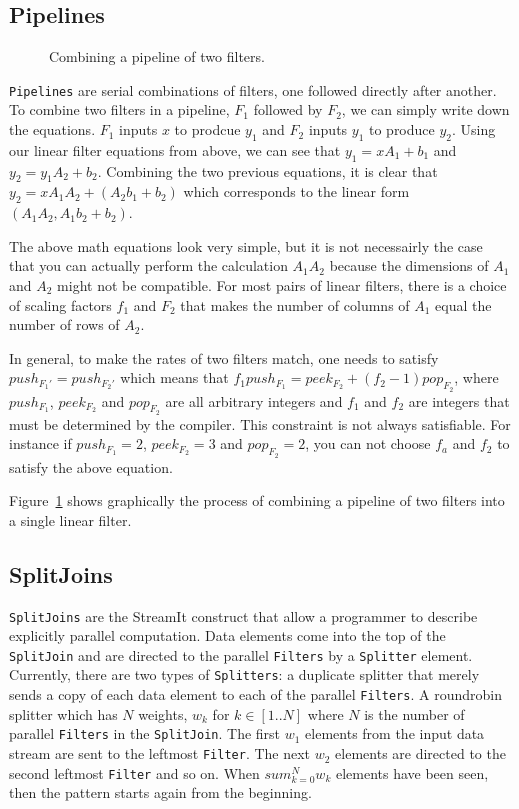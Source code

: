 \subsection{Pipelines}

\begin{figure}
\center
\epsfxsize=3.0in
\caption{Combining a pipeline of two filters.}
\label{fig:combining-pipeline}
\end{figure}

{\tt Pipelines} are serial combinations of filters, one followed directly after 
another. To combine two filters in a pipeline, $F_{1}$ followed by $F_{2}$, we can
simply write down the equations. $F_{1}$ inputs $x$ to prodcue $y_1$ and $F_{2}$
inputs $y_1$ to produce $y_2$. Using our linear filter equations from above,
we can see that $y_1 = xA_1 + b_1$ and $y_2 = y_1A_2 + b_2$. Combining the
two previous equations, it is clear that $y_2 = xA_1A_2 + (A_2b_1 + b_2)$ 
which corresponds to the linear form $(A_1A_2, A_1b_2+b_2)$. 

The above math equations look very simple, but it is not necessairly the case
that you can actually perform the calculation $A_1A_2$ because the dimensions of 
$A_1$ and $A_2$ might not be compatible. For most pairs of linear filters, there
is a choice of scaling factors $f_1$ and $F_2$ that makes the number of columns 
of $A_1$ equal the number of rows of $A_2$.

In general, to make the rates of two filters match, one needs to satisfy
$push_{F_{1}'} = push_{F_{2}'}$ which means that 
$f_1push_{F_1}=peek_{F_2}+(f_2-1)pop_{F_2}$, where $push_{F_1}$,
$peek_{F_2}$ and $pop_{F_2}$ are all arbitrary integers and 
$f_1$ and $f_2$ are integers that must be determined by the compiler.
This constraint is not always satisfiable. For instance if
$push_{F_1}=2$, $peek_{F_2}=3$ and $pop_{F_2}=2$, you can not
choose $f_a$ and $f_2$ to satisfy the above equation.

Figure~\ref{fig:combining-pipeline} shows graphically the process of combining
a pipeline of two filters into a single linear filter.

\subsection{SplitJoins}
{\tt SplitJoins} are the StreamIt construct that allow a programmer to describe explicitly 
parallel computation. Data elements come into the top of the {\tt SplitJoin} and are directed
to the parallel {\tt Filters} by a {\tt Splitter} element. Currently, there are two types of
{\tt Splitters}: a duplicate splitter that merely sends a copy of each data element to each
of the parallel {\tt Filters}. A roundrobin splitter which has $N$ weights, $w_k$ for $k\in[1..N]$
where $N$ is the number of parallel {\tt Filters} in the {\tt SplitJoin}. The first $w_1$ elements
from the input data stream are sent to the leftmost {\tt Filter}. The next $w_2$ elements
are directed to the second leftmost {\tt Filter} and so on. When $sum_{k=0}^{N} w_k$ elements
have been seen, then the pattern starts again from the beginning.

